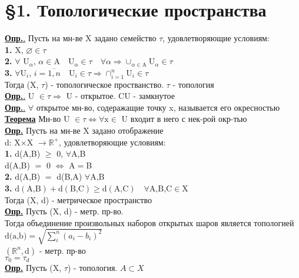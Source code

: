 \documentclass[12pt]{article}
\begin{document}
\section*{\S 1. Топологические пространства}
\underline{\textbf{Опр.}.} Пусть на мн-ве X задано семейство $\tau$, удовлетворяющие
условиям: \\
\textbf{1.} X, $\varnothing \in \tau$ \\
\textbf{2.} $\forall \text{ U}_\alpha \text{, } \alpha \in \text{A} \quad \text{U}_\alpha
\in \tau \quad \forall \alpha \Rightarrow \cup_{\alpha\in\text{A}} 
\text{U}_\alpha \in \tau$  \\
\textbf{3.} $ \forall \text{U}_i \text{, } i=\overline{1,n} \quad \text{U}_i \in \tau \Rightarrow
\cap_{i = 1}^n \text{U}_i \in \tau $\\
Тогда (X, $\tau$) - топологическое простванство. $\tau$ - топология\\
\underline{\textbf{Опр.}.} U $\in \tau \Rightarrow$ U - открытое. CU - замкнутое \\
\underline{\textbf{Опр.}.} $\forall$ открытое мн-во, содеражащие точку x, называется
его окресностью\\
\underline{\textbf{Теорема}} Мн-во U $\in \tau \Leftrightarrow \forall \text{x} \in$ U
входит в него с нек-рой окр-тью \\
\underline{\textbf{Опр.}} Пусть на мн-ве X задано отображение\\
d: X$\times$X $\to \mathbb{R}^+$, удовлетворяющие условиям: \\
\textbf{1.} d(A,B) $\geq$ 0, $\forall$A,B \\
d(A,B) $=$ 0 $\Leftrightarrow$ A$=$B\\
\textbf{2.} d(A,B) $=$ d(B,A) $\forall \text{A,B}$ \\
\textbf{3.} $ \text{d}(\text{A,B}) + \text{d}(\text{B,C}) \geq \text{d}(\text{A,C})
\quad \forall \text{A,B,C} \in \text{X}$ \\
Тогда (X, d) - метрическое пространство \\

\underline{\textbf{Опр.}} Пусть (X, d) - метр. пр-во. \\
Тогда объединение произвольных наборов открытых шаров является топологией\\
$ \text{d(a,b)}= \sqrt{\sum_i^n(a_i - b_i)^2} $ \\
$ (\mathbb{R}^n, \text{d})$ - метр. пр-во\\ 
$\tau_0 = \tau_d $\\
\underline{\textbf{Опр.}} Пусть (X, $\tau$) - топология. $ A \subset X $ \\
\end{document}
